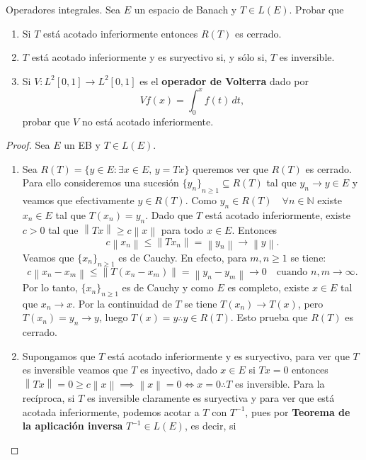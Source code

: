 \documentclass{article}
\theoremstyle{definition}
\newcommand{\N}{\mathbb{N}}
\newcommand{\norm}[1]{\left\lVert #1 \right\rVert}       %
\newenvironment{ejercicio}[1]{\begin{trivlist}
\item[\hskip \labelsep {\bfseries Ejercicio}\hskip \labelsep {\bfseries #1.}]}{\end{trivlist}}
\begin{document}
\begin{ejercicio}{11}
    Operadores integrales. Sea \(E\) un espacio de Banach y \(T\in L(E)\). Probar que
    \begin{enumerate}
        \item Si \(T\) está acotado inferiormente entonces \(R(T)\) es cerrado.
        \item \(T\) está acotado inferiormente y es suryectivo si, y sólo si, \(T\) es inversible.
        \item Si \(V:L^2[0,1]\to L^2[0,1]\) es el \textbf{operador de Volterra} dado por
              \[
                  Vf(x)=\int_0^x f(t)\,dt,
              \]
              probar que \(V\) no está acotado inferiormente.
    \end{enumerate}
\end{ejercicio}
\begin{proof}
    Sea \( E \) un EB y \( T \in L(E) \).
    \begin{enumerate}
        \item Sea \( R(T) = \{ y \in E : \exists x \in E, \, y = Tx \} \) queremos ver que \( R(T) \) es cerrado. Para ello consideremos una sucesión \( {\{y_n\}}_{n\ge1} \subseteq R(T) \) tal que \( y_n \to y \in E \) y veamos que efectivamente \( y \in R(T) \). Como \( y_n \in R(T) \quad \forall n \in \N \) existe \( x_n \in E \) tal que \( T(x_n) = y_n \). Dado que \( T \) está acotado inferiormente, existe \( c > 0 \) tal que \( \norm{Tx} \ge c \norm{x} \) para todo \( x \in E \). Entonces
              \[
                  c \norm{x_n} \le \norm{T x_n} = \norm{y_n} \to \norm{y}.
              \]
              Veamos que \( {\{ x_n \}}_{n \ge 1} \) es de Cauchy. En efecto, para \( m,n \ge 1 \) se tiene: \[
                  c \norm{x_n - x_m} \le \norm{T(x_n - x_m)} = \norm{y_n - y_m} \to 0 \quad \text{cuando } n,m \to \infty.
              \]
              Por lo tanto, \( {\{ x_n \}}_{n \ge 1} \) es de Cauchy y como \( E \) es completo, existe \( x \in E \) tal que \( x_n \to x \). Por la continuidad de \( T \) se tiene \( T(x_n) \to T(x) \), pero \( T(x_n) = y_n \to y \), luego \( T(x) = y \therefore y \in R(T) \). Esto prueba que \( R(T) \) es cerrado.
        \item Supongamos que \( T \) está acotado inferiormente y es suryectivo, para ver que \( T \) es inversible veamos que \( T \) es inyectivo, dado \( x \in E \) si \( Tx = 0 \) entonces \( \norm{Tx} = 0 \ge c \norm{x} \implies \norm{x} = 0 \iff x = 0 \therefore T \) es inversible. Para la recíproca, si \( T \) es inversible claramente es suryectiva y para ver que está acotada inferiormente, podemos acotar a \( T \) con \( T^{-1} \), pues por \textbf{Teorema de la aplicación inversa} \( T^{-1} \in L(E) \), es decir, si \[
\]
\end{enumerate}
\end{proof}
\end{document}
